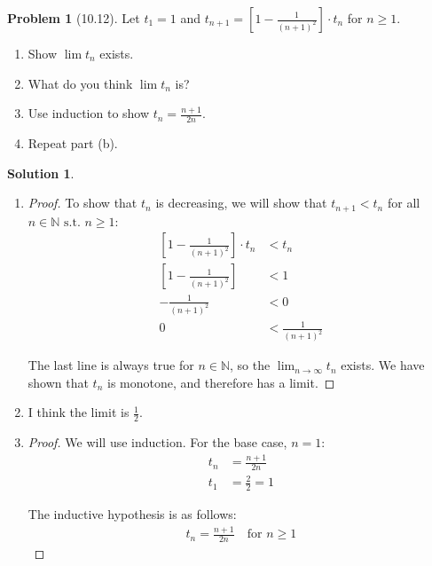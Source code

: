 \documentclass[12pt]{article}
\theoremstyle{definition} %
\newtheorem{solution}{Solution}
\newtheorem{problem}{Problem}
\theoremstyle{plain} %
\begin{document}
\begin{problem}[10.12]
    Let $t_1 = 1$ and $t_{n+1} = \left[1 - \frac{1}{(n+1)^2}\right] \cdot t_n$ for $n \geq 1$.
    \begin{enumerate}[label=(\alph*)]
        \item Show $\lim t_n$ exists.
        \item What do you think $\lim t_n$ is?
        \item Use induction to show $t_n = \frac{n+1}{2n}$.
        \item Repeat part (b).
    \end{enumerate}
\end{problem}

\begin{solution}
    \begin{enumerate}
        \item \begin{proof}
            To show that $t_n$ is decreasing, we will show that $t_{n+1} < t_n$ for all $n \in \mathbb{N} \text{ s.t. } n \geq 1$:
            \begin{align}
                \left[1 - \frac{1}{(n+1)^2}\right] \cdot t_n &< t_n \tag{66} \\
                \left[1 - \frac{1}{(n+1)^2}\right] &< 1 \tag{67} \\
                -\frac{1}{(n+1)^2} &< 0 \tag{68} \\
                0 &< \frac{1}{(n+1)^2} \tag{69}
            \end{align}
        
            The last line is always true for $n \in \mathbb{N}$, so the $\lim_{n \to \infty} t_n$ exists. We have shown that $t_n$ is monotone, and therefore has a limit. 
        \end{proof}
        \item I think the limit is $\frac{1}{2}$.
        \item \begin{proof}
            We will use induction. For the base case, $n = 1$:
            \begin{align}
                t_n &= \frac{n + 1}{2n} \tag{70} \\
                t_1 &= \frac{2}{2} = 1 \tag{71}
            \end{align}
        
            The inductive hypothesis is as follows:
            \begin{align}
            t_n = \frac{n + 1}{2n} \quad \text{for } n \geq 1 \tag{72}
            \end{align}
        

\end{proof}
\end{enumerate}
\end{solution}
\end{document}
